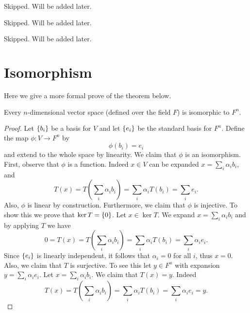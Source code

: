 \begin{problem}
	Skipped. Will be added later.
\end{problem}

\begin{problem}
	Skipped. Will be added later.
\end{problem}

\begin{problem}
	Skipped. Will be added later.
\end{problem}



\section{Isomorphism}
\begin{observation}
	Here we give a more formal prove of the theorem below.
	\begin{theorem}
		Every $ n $-dimensional vector space (defined over the field $ F $) is isomorphic to $ F^n $.
	\end{theorem}
	\begin{proof}
		Let $ \{b_i\} $ be a basis for $ V $ and let $ \{e_i\} $ be the standard basis for $ F^n $. Define the map $ \phi: V \to F^n $ by
		\[ \phi(b_i) = e_i \]
		and extend to the whole space by linearity. We claim that $ \phi $ is an isomorphism. First, observe that $ \phi $ is a function. Indeed $ x \in V $ can be expanded $ x = \sum_i \alpha_i b_i $, and
		\[ T(x) = T(\sum_i \alpha_i b_i) = \sum_i \alpha_i T(b_i) = \sum_i e_i.  \]
		Also, $ \phi $ is linear by construction. Furthermore, we claim that $ \phi $ is injective. To show this we prove that $ \ker T = \{0\} $. Let $ x \in \ker T $. We expand $ x = \sum_i \alpha_i b_i $ and by applying $ T $  we have
		\[ 0 = T(x) = T(\sum_i \alpha_i b_i) = \sum_i \alpha_i T(b_i) = \sum_i \alpha_i e_i.  \]
		Since $ \{e_i\} $ is linearly independent, it follows that $ \alpha_i = 0 $ for all $ i $, thus $ x = 0 $. Also, we claim that $ T $ is surjective. To see this let $ y \in F^n $ with expansion $ y = \sum_i \alpha_i e_i $. Let $ x = \sum_i \alpha_i b_i $. We claim that $ T(x) = y $. Indeed
		\[ T(x) = T(\sum_i \alpha_i b_i) = \sum_i \alpha_i T(b_i) = \sum_i \alpha_i e_i = y. \]
	\end{proof}
\end{observation}

